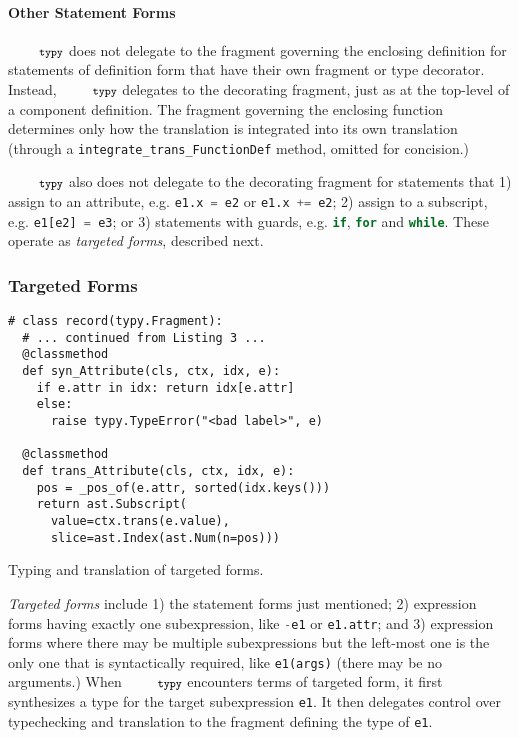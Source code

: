 \documentclass[10pt]{sigplanconf}
\newcommand{\typy}{\texttt{\footnotesize typy}}
\newcommand{\lip}[1]{\lstinline[language=Python,basicstyle=\ttfamily\footnotesize,morekeywords={with},deletendkeywords={tuple,buffer,map}]{#1}}
\newcommand{\li}[1]{\lip{#1}}
\begin{document}
\paragraph{Other Statement Forms}
$\typy$ does not delegate to the fragment governing the enclosing definition for statements of definition form that have their own fragment or type decorator. Instead, $\typy$ delegates to the decorating fragment, just as at the top-level of a component definition. The fragment governing the enclosing function determines only how the translation is integrated into its own translation (through a \li{integrate_trans_FunctionDef} method, omitted for concision.)

$\typy$ also does not delegate to the decorating fragment for statements that 1) assign to an attribute, e.g. \li{e1.x = e2} or \li{e1.x += e2};  2) assign to a subscript, e.g. \li{e1[e2] = e3}; or 3) statements with guards, e.g. \li{if}, \li{for} and \li{while}.  These operate as \emph{targeted forms}, described next.

\subsubsection{Targeted Forms}\label{sec:targeted-forms}

\begin{codelisting}[t]
\vspace{-3px}
\begin{lstlisting}[deletendkeywords={slice}]
# class record(typy.Fragment): 
  # ... continued from Listing 3 ...
  @classmethod
  def syn_Attribute(cls, ctx, idx, e):
    if e.attr in idx: return idx[e.attr]
    else:
      raise typy.TypeError("<bad label>", e)

  @classmethod
  def trans_Attribute(cls, ctx, idx, e): 
    pos = _pos_of(e.attr, sorted(idx.keys()))
    return ast.Subscript(
      value=ctx.trans(e.value),
      slice=ast.Index(ast.Num(n=pos)))
\end{lstlisting}
\caption{Typing and translation of targeted forms.}
\label{fig:record-elim}
\end{codelisting}
\emph{Targeted forms} include 1) the statement forms just mentioned; 2) expression forms having exactly one subexpression, like \lip{-e1} or \lip{e1.attr}; and 3) expression forms where there may be multiple subexpressions but the left-most one is the only one that is syntactically required, like \lip{e1(args)} (there may be no arguments.) When $\typy$ encounters terms of targeted form, it first synthesizes a type for the target subexpression \li{e1}. It then delegates control over typechecking and translation to the fragment defining the type of \li{e1}.
\end{document}
